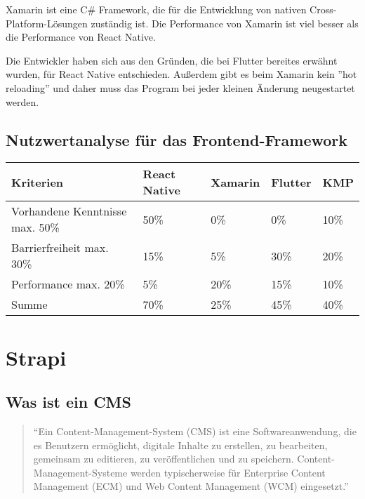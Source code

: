\begin{spacing}{1}
    Xamarin ist eine C\# Framework, die für die Entwicklung von nativen Cross-Platform-Lösungen zuständig ist.
    Die Performance von Xamarin ist viel besser als die Performance von React Native. \cite{xamarin-vs-react-native}

    Die Entwickler haben sich aus den Gründen, die bei Flutter bereites erwähnt wurden, für React Native entschieden.
    Außerdem gibt es beim Xamarin kein ''hot reloading'' und daher muss das
    Program bei jeder kleinen Änderung neugestartet werden.\cite{xamarin-vs-react-native}



    \subsection{Nutzwertanalyse für das Frontend-Framework}
    \begin{tabular}{|p{5cm} | p{2cm} | p{2cm} | p{2cm} | p{2cm} | }
        \hline
        Kriterien                       & React Native & Xamarin & Flutter & KMP  \\
        \hline
        Vorhandene Kenntnisse max. 50\% & 50\%         & 0\%     & 0\%     & 10\% \\
        \hline
        Barrierfreiheit max. 30\%       & 15\%         & 5\%     & 30\%    & 20\% \\
        \hline
        Performance max. 20\%           & 5\%          & 20\%    & 15\%    & 10\% \\
        \hline
        Summe                           & 70\%         & 25\%    & 45\%    & 40\% \\
        \hline
    \end{tabular}





    \section{Strapi}

    \subsection{Was ist ein CMS}

    \begin{quotation}
        ``Ein Content-Management-System (CMS) ist eine Softwareanwendung,
        die es Benutzern ermöglicht, digitale Inhalte zu erstellen, zu bearbeiten, gemeinsam zu editieren,
        zu veröffentlichen und zu speichern. Content-Management-Systeme werden typischerweise für Enterprise
        Content Management (ECM) und Web Content Management (WCM) eingesetzt.''
        \cite{cms}
    \end{quotation}




\end{spacing}
